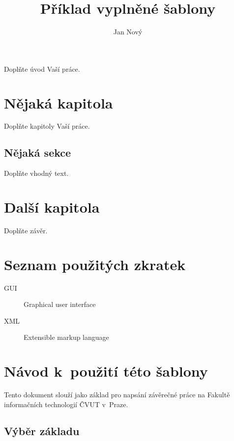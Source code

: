 \documentclass[thesis=B,czech]{FITthesis}[2019/12/23]
\title{Příklad vyplněné šablony}
\author{Jan Nový} %
\begin{document}
\begin{introduction}
	Doplňte úvod Vaší práce.
\end{introduction}

\chapter{Nějaká kapitola}

Doplňte kapitoly Vaší práce.

\section{Nějaká sekce}

Doplňte vhodný text.

\chapter{Další kapitola}


\begin{conclusion}
	Doplňte závěr.
	
\end{conclusion}




\appendix

\chapter{Seznam použitých zkratek}
\begin{description}
	\item[GUI] Graphical user interface
	\item[XML] Extensible markup language
\end{description}



\chapter{Návod k~použití této šablony}

Tento dokument slouží jako základ pro napsání závěrečné práce na Fakultě informačních technologií ČVUT v~Praze.

\section{Výběr základu}
\end{document}
